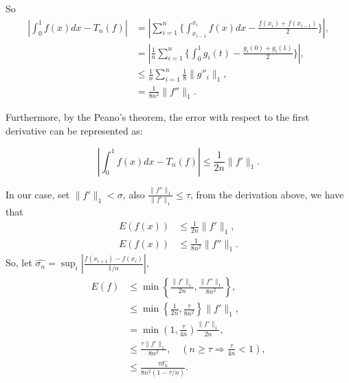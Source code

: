 So
\begin{align*}
  \left|\int_{0}^{1}f(x)dx-T_n(f)\right|&=\left|\sum_{i=1}^{n}\{\int_{x_{i-1}}^{x_i}f(x)dx-\frac{f(x_i)+f(x_{i-1})}{2}\}\right|,\\
  &=\left|\frac{1}{n}\sum_{i=1}^{n}\{\int_{0}^{1}g_i(t)-\frac{g_i(0)+g_i(1)}{2}\}\right|,\\
  &\leq\frac{1}{n}\sum_{i=1}^{n}\frac{1}{8}\|g''_i\|_1,\\
  &=\frac{1}{8n^2}\|f''\|_1.
\end{align*}

Furthermore, by the Peano's theorem, the error with respect to the first derivative can be represented as:

$$\left|\int_{0}^{1}f(x)dx-T_n(f)\right|\leq\frac{1}{2n}\|f'\|_{1}.$$

In our case, set $\|f'\|_{1}<\sigma$, also $\frac{\|f''\|_{1}}{\|f'\|_{1}}\leq\tau$, from the derivation above, we have that
\begin{align*}
  E(f(x)) &\leq \frac{1}{2n}\|f'\|_{1},\\
  E(f(x)) &\leq \frac{1}{8n^2}\|f''\|_{1}.
\end{align*}
So, let $\hat{\sigma_n}=\sup_i\left|\frac{f(x_{i+1})-f(x_i)}{1/n}\right|$,
\begin{align*}
  E(f) &\leq \min\left\{\frac{\|f'\|_{1}}{2n},\frac{\|f''\|_{1}}{8n^2}\right\},\\
  &\leq \min\left\{\frac{1}{2n},\frac{\tau}{8n^2}\right\}\|f'\|_{1},\\
  &= \min(1,\frac{\tau}{4n})\frac{\|f'\|_{1}}{2n},\\
  &\leq \frac{\tau\|f'\|_{1}}{8n^2}, \quad (n\geq \tau \Rightarrow \frac{\tau}{4n}<1),\\
  &\leq \frac{\tau\hat{\sigma_n}}{8n^2(1-\tau/n)}.
\end{align*}


